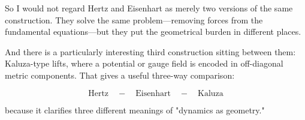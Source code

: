 So I would not regard Hertz and Eisenhart as merely two versions of the same construction. They solve the same problem—removing forces from the fundamental equations—but they put the geometrical burden in different places.

And there is a particularly interesting third construction sitting between them: Kaluza-type lifts, where a potential or gauge field is encoded in off-diagonal metric components. That gives a useful three-way comparison:

$$ \boxed{\text{Hertz}\quad-\quad\text{Eisenhart}\quad-\quad\text{Kaluza}} $$

because it clarifies three different meanings of "dynamics as geometry."
